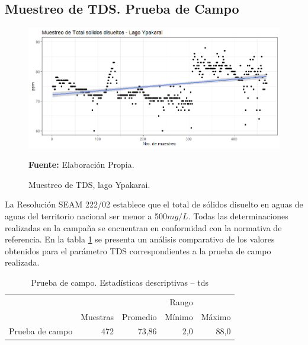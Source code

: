 \subsection{Muestreo de TDS. Prueba de Campo}

\begin{figure}[H]
        \centering
        \includegraphics[width=0.75\linewidth]{Imagenes/cap4/TDS LagoYpakarai.png}
        \caption {Muestreo de TDS, lago Ypakarai. }{\textbf{Fuente:}
        Elaboraci\'on Propia. }
        \label{fig:Lago_tds}
\end{figure}

La Resoluci\'on SEAM 222/02 establece que el total de s\'olidos disuelto en aguas de aguas del territorio nacional ser menor a  500$ mg /L$. Todas las determinaciones realizadas en la campa\~na se encuentran en conformidad con la normativa de referencia.
En la tabla \ref{table:Lago_tds} se presenta un an\'alisis comparativo de los valores obtenidos para el par\'ametro TDS correspondientes a la prueba de campo  realizada.

\begin{table}[H]
\centering
\caption{Prueba de campo. Estadísticas descriptivas – tds}
\label{table:Lago_tds}
\begin{tabular}{lrrrr}
\toprule
          & \multicolumn{3}{r}{Rango} \\ \cline{4-5}
          & Muestras & Promedio & Mínimo & Máximo \\
\midrule
Prueba de campo  &      472 &    73,86 &    2,0 &   88,0 \\
\bottomrule
\end{tabular}
\end{table}

